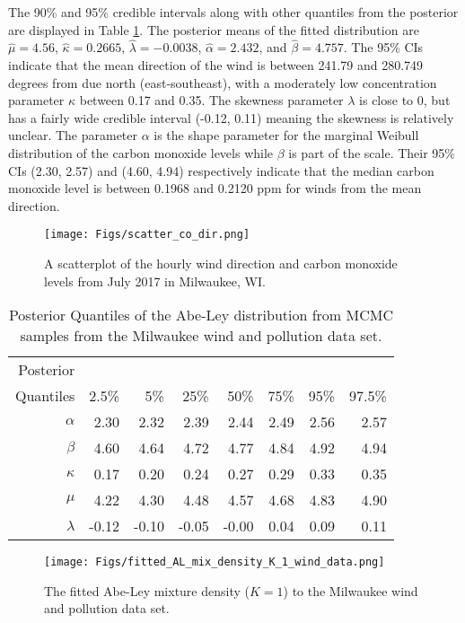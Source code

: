 The 90\% and 95\% credible intervals along with other quantiles from the posterior are displayed in Table \ref{tab:quantiles}. The posterior means of the fitted distribution are $\hat{\mu} = 4.56$, $\hat{\kappa} = 0.2665$, $\hat{\lambda} = -0.0038$, $\hat{\alpha} = 2.432$, and $\hat{\beta} = 4.757$. The 95\% CIs indicate that the mean direction of the wind is between 241.79 and 280.749 degrees from due north (east-southeast), with a moderately low concentration parameter $\kappa$ between 0.17 and 0.35. The skewness parameter $\lambda$ is close to 0, but has a fairly wide credible interval (-0.12, 0.11) meaning the skewness is relatively unclear. The parameter $\alpha$ is the shape parameter for the marginal Weibull distribution of the carbon monoxide levels while $\beta$ is part of the scale. Their 95\% CIs (2.30, 2.57) and (4.60, 4.94) respectively indicate that the median carbon monoxide level is between 0.1968 and 0.2120 ppm for winds from the mean direction. 

\begin{figure}[ht]
    \centering
    \texttt{[image: Figs/scatter\_co\_dir.png]}
    \caption{A scatterplot of the hourly wind direction and carbon monoxide levels from July 2017 in Milwaukee, WI.}
    \label{fig:scatter}
\end{figure}

\begin{table}[ht]
\centering
\begin{tabular}{rrrrrrrr}
  \hline
Posterior \\
Quantiles & 2.5\% & 5\% & 25\% & 50\% & 75\% & 95\% & 97.5\% \\ 
  \hline
  $\alpha$ & 2.30 & 2.32 & 2.39 & 2.44 & 2.49 & 2.56 & 2.57 \\ 
  $\beta$ & 4.60 & 4.64 & 4.72 & 4.77 & 4.84 & 4.92 & 4.94 \\ 
  $\kappa$ & 0.17 & 0.20 & 0.24 & 0.27 & 0.29 & 0.33 & 0.35 \\ 
  $\mu$ & 4.22 & 4.30 & 4.48 & 4.57 & 4.68 & 4.83 & 4.90 \\ 
  $\lambda$ & -0.12 & -0.10 & -0.05 & -0.00 & 0.04 & 0.09 & 0.11 \\ 
   \hline
\end{tabular}
\caption{Posterior Quantiles of the Abe-Ley distribution from MCMC samples from the Milwaukee wind and pollution data set.} 
\label{tab:quantiles}
\end{table}


\begin{figure}[ht]
    \centering
    \texttt{[image: Figs/fitted\_AL\_mix\_density\_K\_1\_wind\_data.png]}
    \caption{The fitted Abe-Ley mixture density ($K=1$) to the Milwaukee wind and pollution data set.}
    \label{fig:fitted}
\end{figure}

